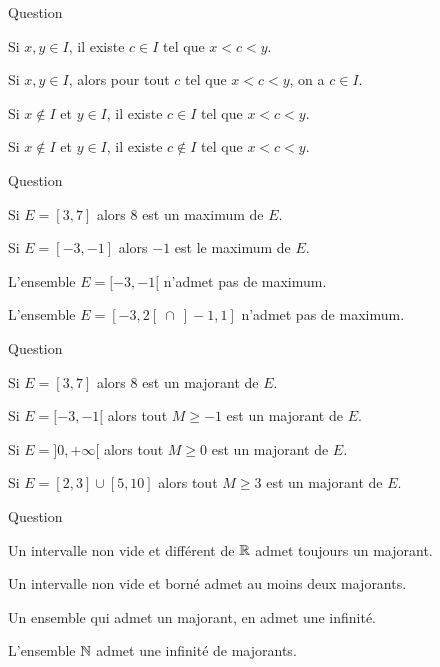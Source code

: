 \begin{multi}[multiple,feedback=
{Si \(x\) et \(y\) sont deux éléments de l'intervalle \(I\) alors toute valeur entre \(x\) et \(y\) est aussi dans l'intervalle.
}]{Question}
    \item* Si \(x,y\in I\), il existe \(c\in I\) tel que \(x < c < y\).
    \item* Si \(x,y\in I\), alors pour tout \(c\) tel que \(x < c < y\), on a \(c \in I\).
    \item* Si \(x \notin I\) et \(y\in I\), il existe \(c\in I\) tel que \(x < c < y\).
    \item Si \(x \notin I\) et \(y\in I\), il existe \(c\notin I\) tel que \(x < c < y\).
\end{multi}


\begin{multi}[multiple,feedback=
{Attention, le maximum de \(E\) doit être un élément de \(E\) !
}]{Question}
    \item Si \(E = [3,7]\) alors \(8\) est un maximum de \(E\).
    \item* Si \(E = [-3,-1]\) alors \(-1\) est le maximum de \(E\).
    \item* L'ensemble \(E = [-3,-1[\) n'admet pas de maximum.
    \item L'ensemble \(E = [-3,2[ \  \cap \  ]-1,1]\) n'admet pas de maximum.
\end{multi}


\begin{multi}[multiple,feedback=
{Tracer les intervalles sur la droite réelle pour mieux comprendre. Les majorants d'un ensemble sont alors tous les réels "à droite" de l'ensemble.
}]{Question}
    \item* Si \(E = [3,7]\) alors \(8\) est un majorant de \(E\).
    \item* Si \(E = [-3,-1[\) alors tout \(M \ge -1\) est un majorant de \(E\).
    \item Si \(E = ]0,+\infty[\) alors tout \(M \ge 0\) est un majorant de \(E\).
    \item Si \(E = [2,3] \cup [5,10]\) alors tout \(M \ge 3\) est un majorant de \(E\).
\end{multi}


\begin{multi}[multiple,feedback=
{L'ensemble des majorants (s'il est non vide) est du type \([M,+\infty[\).
}]{Question}
    \item Un intervalle non vide et différent de \(\mathbb{R}\) admet toujours un majorant.
    \item* Un intervalle non vide et borné admet au moins deux majorants.
    \item* Un ensemble qui admet un majorant, en admet une infinité.
    \item L'ensemble \(\mathbb{N}\) admet une infinité de majorants.
\end{multi}
